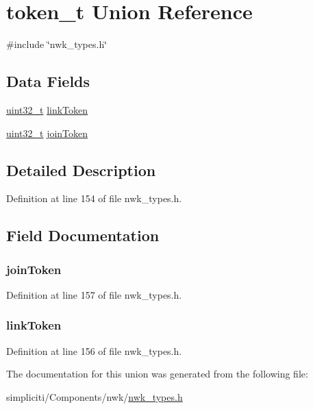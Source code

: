 \hypertarget{uniontoken__t}{\section{token\-\_\-t \-Union \-Reference}
\label{uniontoken__t}
}


{\ttfamily \#include \char`\"{}nwk\-\_\-types.\-h\char`\"{}}

\subsection*{\-Data \-Fields}
\begin{DoxyCompactItemize}
\item 
\hyperlink{bsp__msp430__defs_8h_a06896e8c53f721507066c079052171f8}{uint32\-\_\-t} \hyperlink{uniontoken__t_a3e14395c76be7424b9c4ec8a64f90980}{link\-Token}
\item 
\hyperlink{bsp__msp430__defs_8h_a06896e8c53f721507066c079052171f8}{uint32\-\_\-t} \hyperlink{uniontoken__t_ab456f80b5caa7e3f65f9f51efbb021eb}{join\-Token}
\end{DoxyCompactItemize}


\subsection{\-Detailed \-Description}


\-Definition at line 154 of file nwk\-\_\-types.\-h.



\subsection{\-Field \-Documentation}
\hypertarget{uniontoken__t_ab456f80b5caa7e3f65f9f51efbb021eb}{
\subsubsection[{join\-Token}]{ {\bf join\-Token}}}\label{uniontoken__t_ab456f80b5caa7e3f65f9f51efbb021eb}


\-Definition at line 157 of file nwk\-\_\-types.\-h.

\hypertarget{uniontoken__t_a3e14395c76be7424b9c4ec8a64f90980}{
\subsubsection[{link\-Token}]{ {\bf link\-Token}}}\label{uniontoken__t_a3e14395c76be7424b9c4ec8a64f90980}


\-Definition at line 156 of file nwk\-\_\-types.\-h.



\-The documentation for this union was generated from the following file\-:\begin{DoxyCompactItemize}
\item 
simpliciti/\-Components/nwk/\hyperlink{nwk__types_8h}{nwk\-\_\-types.\-h}\end{DoxyCompactItemize}
